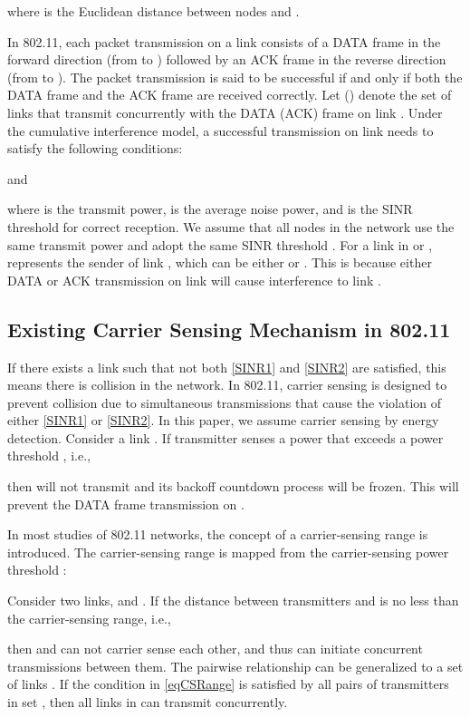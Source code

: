 \documentclass[conference]{IEEEtran}
\begin{document}
where  is the Euclidean distance between nodes  and
.


In 802.11, each packet transmission on a link  consists of a
DATA frame in the forward direction (from  to ) followed
by an ACK frame in the reverse direction (from  to ). The
packet transmission is said to be successful if and only if both the
DATA frame and the ACK frame are received correctly. Let
 () denote the set of links that
transmit concurrently with the DATA (ACK) frame on link . Under
the cumulative interference model, a successful transmission on link
 needs to satisfy the following conditions:

and

where  is the transmit power,  is the average noise power,
and  is the SINR threshold for correct reception. We
assume that all nodes in the network use the same transmit power
 and adopt the same SINR threshold . For a link 
in  or ,  represents the sender of
link , which can be either  or . This is because
either DATA or ACK transmission on link  will cause
interference to link .





\subsection{Existing Carrier Sensing Mechanism in 802.11}\label{carriersense}

If there exists a link  such that not both
\eqref{SINR1} and \eqref{SINR2} are satisf\/ied, this means there is
collision in the network. In 802.11, carrier sensing is designed to
prevent collision due to simultaneous transmissions that cause the
violation of either \eqref{SINR1} or \eqref{SINR2}. In this paper,
we assume carrier sensing by energy detection. Consider a link
. If transmitter  senses a power  that
exceeds a power threshold , i.e.,

then  will not transmit and its backoff countdown process will
be frozen. This will prevent the DATA frame transmission on .

In most studies of 802.11 networks, the concept of a carrier-sensing
range  is introduced. The carrier-sensing range  is mapped
from the carrier-sensing power threshold :


Consider two links,  and . If the distance between
transmitters  and  is no less than the carrier-sensing
range, i.e.,

then  and  can not carrier sense each other, and thus can
initiate concurrent transmissions between them. The pairwise
relationship can be generalized to a set of links
. If the condition in
\eqref{eqCSRange} is satisf\/ied by all pairs of transmitters in set
, then all links in  can
transmit concurrently.
\end{document}
